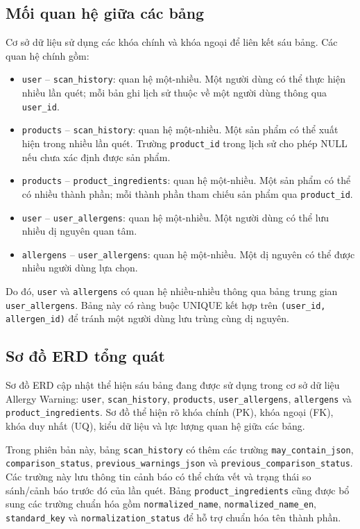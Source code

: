 \subsection{Mối quan hệ giữa các bảng}

Cơ sở dữ liệu sử dụng các khóa chính và khóa ngoại để liên kết sáu bảng. Các quan hệ chính gồm:

\begin{itemize}
	\item \texttt{user} -- \texttt{scan\_history}: quan hệ một-nhiều. Một người dùng có thể thực hiện nhiều lần quét; mỗi bản ghi lịch sử thuộc về một người dùng thông qua \texttt{user\_id}.
	\item \texttt{products} -- \texttt{scan\_history}: quan hệ một-nhiều. Một sản phẩm có thể xuất hiện trong nhiều lần quét. Trường \texttt{product\_id} trong lịch sử cho phép NULL nếu chưa xác định được sản phẩm.
	\item \texttt{products} -- \texttt{product\_ingredients}: quan hệ một-nhiều. Một sản phẩm có thể có nhiều thành phần; mỗi thành phần tham chiếu sản phẩm qua \texttt{product\_id}.
	\item \texttt{user} -- \texttt{user\_allergens}: quan hệ một-nhiều. Một người dùng có thể lưu nhiều dị nguyên quan tâm.
	\item \texttt{allergens} -- \texttt{user\_allergens}: quan hệ một-nhiều. Một dị nguyên có thể được nhiều người dùng lựa chọn.
\end{itemize}

Do đó, \texttt{user} và \texttt{allergens} có quan hệ nhiều-nhiều thông qua bảng trung gian \texttt{user\_allergens}. Bảng này có ràng buộc UNIQUE kết hợp trên \texttt{(user\_id, allergen\_id)} để tránh một người dùng lưu trùng cùng dị nguyên.

\subsection{Sơ đồ ERD tổng quát}

Sơ đồ ERD cập nhật thể hiện sáu bảng đang được sử dụng trong cơ sở dữ liệu Allergy Warning: \texttt{user}, \texttt{scan\_history}, \texttt{products}, \texttt{user\_allergens}, \texttt{allergens} và \texttt{product\_ingredients}. Sơ đồ thể hiện rõ khóa chính (PK), khóa ngoại (FK), khóa duy nhất (UQ), kiểu dữ liệu và lực lượng quan hệ giữa các bảng.

Trong phiên bản này, bảng \texttt{scan\_history} có thêm các trường \texttt{may\_contain\_json}, \texttt{comparison\_status}, \texttt{previous\_warnings\_json} và \texttt{previous\_comparison\_status}. Các trường này lưu thông tin cảnh báo có thể chứa vết và trạng thái so sánh/cảnh báo trước đó của lần quét. Bảng \texttt{product\_ingredients} cũng được bổ sung các trường chuẩn hóa gồm \texttt{normalized\_name}, \texttt{normalized\_name\_en}, \texttt{standard\_key} và \texttt{normalization\_status} để hỗ trợ chuẩn hóa tên thành phần.

